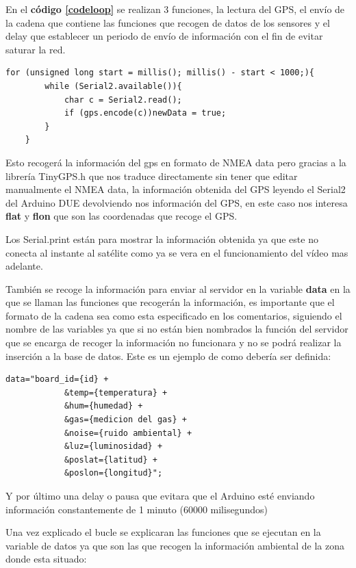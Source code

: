 En el \textbf{código \ref{codeloop}} se realizan 3 funciones, la lectura del GPS, el envío de la cadena que contiene las funciones que recogen de datos de los sensores y el delay que establecer un periodo de envío de información con el fin de evitar saturar la red.\\

\begin{lstlisting}[caption=Lectura en crudo del GPS, label=gpscon]
	for (unsigned long start = millis(); millis() - start < 1000;){
		while (Serial2.available()){
			char c = Serial2.read();
			if (gps.encode(c))newData = true;
		}
	}
\end{lstlisting}

Esto recogerá la información del gps en formato de NMEA data pero gracias a la librería TinyGPS.h que nos traduce directamente sin tener que editar manualmente el NMEA data, la información obtenida del GPS leyendo el Serial2 del Arduino DUE devolviendo nos información del GPS, en este caso nos interesa \textbf{flat} y \textbf{flon} que son las coordenadas que recoge el GPS.

 Los Serial.print están para mostrar la información obtenida ya que este no conecta al instante al satélite como ya se vera en el funcionamiento del vídeo mas adelante.

También se recoge la información para enviar al servidor en la variable \textbf{data} en la que se llaman las funciones que recogerán la información, es importante que el formato de la cadena sea como esta especificado en los comentarios, siguiendo el nombre de las variables ya que si no están bien nombrados la función del servidor que se encarga de recoger la información no funcionara y no se podrá realizar la inserción a la base de datos. Este es un ejemplo de como debería ser definida:

\begin{lstlisting}[caption=Formato de la String que se enviará, label=formatstring]
		data="board_id={id} +
			&temp={temperatura} +
			&hum={humedad} +
			&gas={medicion del gas} +
			&noise={ruido ambiental} +
			&luz={luminosidad} +
			&poslat={latitud} +
			&poslon={longitud}";
\end{lstlisting}

Y por último una delay o pausa que evitara que el Arduino esté enviando información constantemente de 1 minuto (60000 milisegundos)

Una vez explicado el bucle se explicaran las funciones que se ejecutan en la variable de datos ya que son las que recogen la información ambiental de la zona donde esta situado:\\

